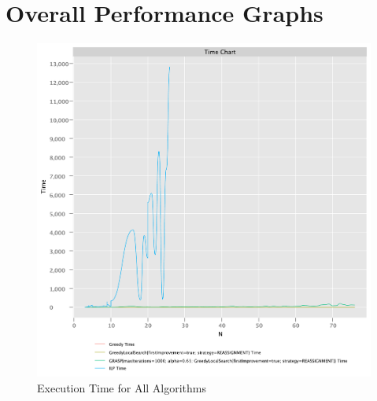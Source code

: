 \documentclass{article}
\begin{document}
\newpage

\section{Overall Performance Graphs}

\begin{figure}[!h]
    \centering
    \includegraphics[width=1\textwidth]{./documentation/assets/new.all.timeChart.pdf}
    \caption{Execution Time for All Algorithms}
    \label{fig:all_time}
\end{figure}\FloatBarrier
\end{document}
